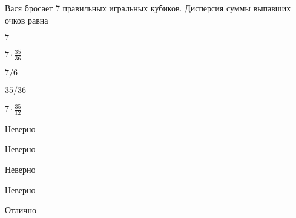 
\begin{question}
Вася бросает 7 правильных игральных кубиков. Дисперсия суммы выпавших
очков равна
\begin{answerlist}
  \item \(7\)
  \item \(7\cdot \frac{35}{36}\)
  \item \(7/6\)
  \item \(35/36\)
  \item \(7\cdot\frac{35}{12}\)
\end{answerlist}
\end{question}

\begin{solution}
\begin{answerlist}
  \item Неверно
  \item Неверно
  \item Неверно
  \item Неверно
  \item Отлично
\end{answerlist}
\end{solution}

